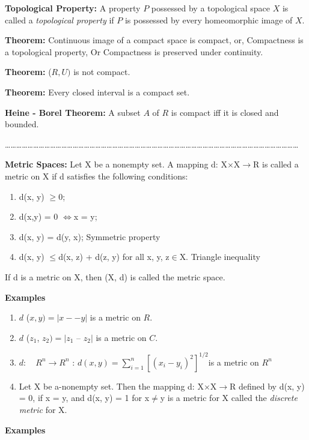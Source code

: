 \documentclass[12pt]{amsart}
\begin{document}
\textbf{Topological Property:} A property $P$ possessed by a topological space 
$X$ is called a \textit{topological property} if $P$ is possessed by every homeomorphic image of $X$.

\textbf{Theorem:} Continuous image of a compact space is compact, or, 
Compactness is a topological property, Or Compactness is preserved under 
continuity.

\textbf{Theorem:} ($R, U )$ is not compact.

\textbf{Theorem:} Every closed interval is a compact set.

\textbf{Heine - Borel Theorem:} A subset $A$ of $R$ is compact iff it is closed 
and bounded.

{\ldots}{\ldots}{\ldots}{\ldots}{\ldots}{\ldots}{\ldots}{\ldots}{\ldots}{\ldots}{\ldots}{\ldots}{\ldots}{\ldots}{\ldots}{\ldots}{\ldots}{\ldots}{\ldots}{\ldots}{\ldots}{\ldots}{\ldots}{\ldots}{\ldots}{\ldots}{\ldots}{\ldots}{\ldots}{\ldots}{\ldots}{\ldots}{\ldots}{\ldots}{\ldots}{\ldots}{\ldots}{\ldots}{\ldots}{\ldots}{\ldots}{\ldots}{\ldots}{\ldots}{\ldots}{\ldots}{\ldots}{\ldots}{\ldots}{\ldots}{\ldots}{\ldots}

\textbf{Metric Spaces:} Let X be a nonempty set. A mapping d: X$\times 
$X$\to $R is called a metric on X if d satisfies the following conditions:

\begin{enumerate}
\item d(x, y) $\geqslant $0; 
\item d(x,y) = 0 $\Leftrightarrow $x = y;
\item d(x, y) = d(y, x); Symmetric property
\item d(x, y) $\leqslant $d(x, z) + d(z, y) for all x, y, z$\in $X. Triangle inequality
\end{enumerate}
If d is a metric on X, then (X, d) is called the metric space. 

\textbf{Examples}

\begin{enumerate}
\item $d$ ($x, y)=\vert x -- y\vert $ is a metric on $R$.
\item $d$ ($z_{1}$, $z_{2})=\vert z_{1}$ -- $z_{2}\vert $ is a metric on $C$.
\item $d: \quad R^{n}\to R^{n}$ : $d (x, y)=\sum\limits_{i=1}^n {[(x_i -y_i )^2]^{1/2}} $is a metric on $R^{n}$
\item Let X be a-nonempty set. Then the mapping d: X$\times $X$\to $R defined by d(x, y) = 0, if x = y, and d(x, y) = 1 for x$\ne $y is a metric for X called the \textit{discrete metric} for X.
\end{enumerate}
\textbf{Examples}
\end{document}
